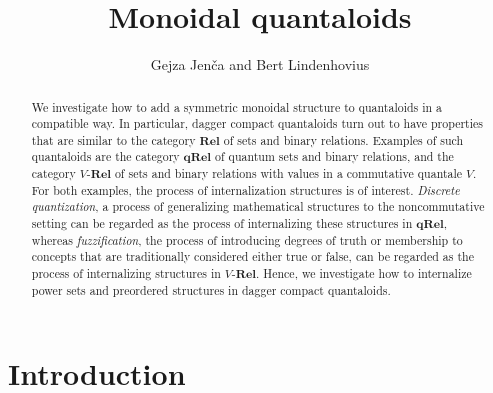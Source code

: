 \documentclass[12pt]{tac}
\title{Monoidal quantaloids}
\author{Gejza Jen\v{c}a and Bert Lindenhovius}
\theoremstyle{definition}
\theoremstyle{remark}
\newcommand{\<}{\langle}
\renewcommand{\>}{\rangle}
\renewcommand{\:}{\colon}
\begin{document}
\maketitle



\begin{abstract}
We investigate how to add a symmetric monoidal structure to quantaloids in a compatible way. In particular, dagger compact quantaloids turn out to have properties that are similar to the category $\mathbf{Rel}$ of sets and binary relations. Examples of such quantaloids are the category $\mathbf{qRel}$ of quantum sets and binary relations, and the category $V$-$\mathbf{Rel}$ of sets and binary relations with values in a commutative quantale $V$. For both examples, the process of internalization structures is of interest. \emph{Discrete quantization}, a process of generalizing mathematical structures to the noncommutative setting can be regarded as the process of internalizing these structures in $\mathbf{qRel}$, whereas \emph{fuzzification}, the process of introducing degrees of truth or membership to concepts that are traditionally considered either true or false, can be regarded as the process of internalizing structures in $V$-$\mathbf{Rel}$. Hence, we investigate how to internalize power sets and preordered structures in dagger compact quantaloids.
\end{abstract}

\tableofcontents


\section{Introduction}
\end{document}
